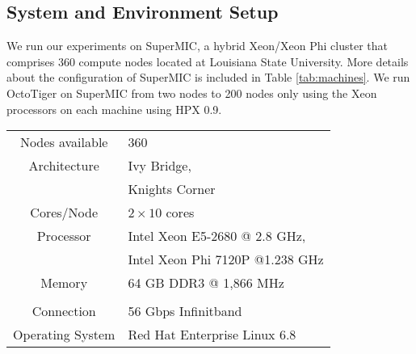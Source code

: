 \subsection{System and Environment Setup}
We run our experiments on SuperMIC, a hybrid Xeon/Xeon Phi cluster that
comprises 360 compute nodes located at Louisiana State University. More
details about the configuration of SuperMIC is included in Table
\ref{tab:machines}. We run OctoTiger on SuperMIC from
two nodes to 200 nodes only using the Xeon processors on each machine using
HPX 0.9\cite{hartmut_kaiser_2015_33656}.


\begin{table*}
  \centering
  \caption{SuperMIC Configuration}
  \label{tab:machines}
    \begin{tabular}{cl}  
    \toprule
    Nodes available  & 360                             \\
    Architecture     & Ivy Bridge,                     \\
                     & Knights Corner                  \\
    Cores/Node       & $2 \times 10$ cores             \\
    Processor        & Intel Xeon E5-2680 @ 2.8 GHz,   \\
                     & Intel Xeon Phi 7120P @1.238 GHz \\
    Memory           & 64 GB DDR3 @ 1,866 MHz          \\
                     &                                 \\
    Connection       & 56 Gbps Infinitband             \\
    Operating System & Red Hat Enterprise Linux 6.8    \\
    \bottomrule
    \end{tabular}
\end{table*}

